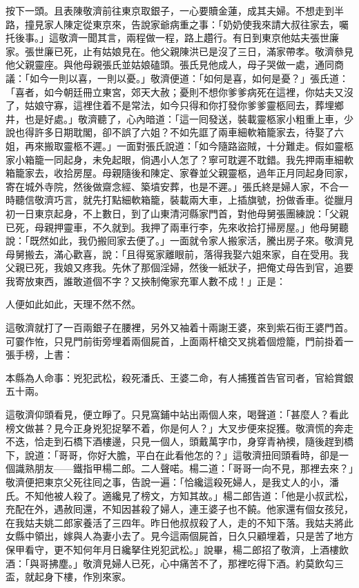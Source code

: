 按下一頭。且表陳敬濟前往東京取銀子，一心要贖金蓮，成其夫婦。不想走到半路，撞見家人陳定從東京來，告說家爺病重之事：「奶奶使我來請大叔往家去，囑托後事。」這敬濟一聞其言，兩程做一程，路上趲行。有日到東京他姑夫張世廉家。張世廉已死，止有姑娘見在。他父親陳洪已是沒了三日，滿家帶孝。敬濟叅見他父親靈座。與他母親張氏並姑娘磕頭。張氏見他成人，母子哭做一處，通同商議：「如今一則以喜，一則以憂。」{}敬濟便道：「如何是喜，如何是憂？」張氏道：「喜者，如今朝廷冊立東宮，郊天大赦；憂則不想你爹爹病死在這裡，你姑夫又沒了，姑娘守寡，這裡住着不是常法，如今只得和你打發你爹爹靈柩囘去，葬埋鄉井，也是好處。」敬濟聽了，心內暗道：「這一囘發送，裝載靈柩家小粗重上車，少說也得許多日期耽閣，卻不誤了六姐？{}不如先誆了兩車細軟箱籠家去，待娶了六姐，再來搬取靈柩不遲。」一面對張氏說道：「如今隨路盜賊，十分難走。假如靈柩家小箱籠一同起身，未免起眼，倘遇小人怎了？寧可耽遲不耽錯。我先押兩車細軟箱籠家去，收拾房屋。母親隨後和陳定、家眷並父親靈柩，過年正月同起身囘家，寄在城外寺院，然後做齋念經、築墳安葬，也是不遲。」張氏終是婦人家，不合一時聽信敬濟巧言，就先打點細軟箱籠，裝載兩大車，上插旗號，扮做香車。從臘月初一日東京起身，不上數日，到了山東清河縣家門首，對他母舅張團練說：「父親已死，母親押靈車，不久就到。我押了兩車行李，先來收拾打掃房屋。」他母舅聽說：「既然如此，我仍搬囘家去便了。」一面就令家人搬家活，騰出房子來。敬濟見母舅搬去，滿心歡喜，說：「且得冤家離眼前，落得我娶六姐來家，自在受用。我父親已死，我娘又疼我。先休了那個淫婦，然後一紙狀子，把俺丈母告到官，追要我寄放東西，誰敢道個不字？{}又挾制俺家充軍人數不成！」正是：

\begin{myquote}
人便如此如此，天理不然不然。
\end{myquote}

這敬濟就打了一百兩銀子在腰裡，另外又袖着十兩謝王婆，來到紫石街王婆門首。可霎作恠，只見門前街旁埋着兩個屍首，上面兩杆槍交叉挑着個燈籠，門前掛着一張手榜，上書：

\begin{myquote}[\markfont]
本縣為人命事：兇犯武松，殺死潘氏、王婆二命，有人捕獲首告官司者，官給賞銀五十兩。
\end{myquote}

這敬濟仰頭看見，便立睜了。只見窩鋪中站出兩個人來，喝聲道：「甚麼人？看此榜文做甚？見今正身兇犯捉拏不着，你是何人？」大叉步便來捉獲。敬濟慌的奔走不迭，恰走到石橋下酒樓邊，只見一個人，頭戴萬字巾，身穿青衲襖，隨後趕到橋下，說道：「哥哥，你好大膽，平白在此看他怎的？」這敬濟扭囘頭看時，卻是一個識熟朋友——鐵指甲楊二郎。二人聲喏。楊二道：「哥哥一向不見，那裡去來？」敬濟便把東京父死往囘之事，告說一遍：「恰纔這殺死婦人，是我丈人的小，潘氏。不知他被人殺了。適纔見了榜文，方知其故。」楊二郎告道：「他是小叔武松，充配在外，遇赦囘還，不知因甚殺了婦人，連王婆子也不饒。他家還有個女孩兒，在我姑夫姚二郎家養活了三四年。昨日他叔叔殺了人，走的不知下落。我姑夫將此女縣中領出，嫁與人為妻小去了。{}見今這兩個屍首，日久只顧埋着，只是苦了地方保甲看守，更不知何年月日纔拏住兇犯武松。」說畢，楊二郎招了敬濟，上酒樓飲酒：「與哥拂塵。」敬濟見婦人已死，心中痛苦不了，那裡吃得下酒。約莫飲勾三盃，就起身下樓，作別來家。

